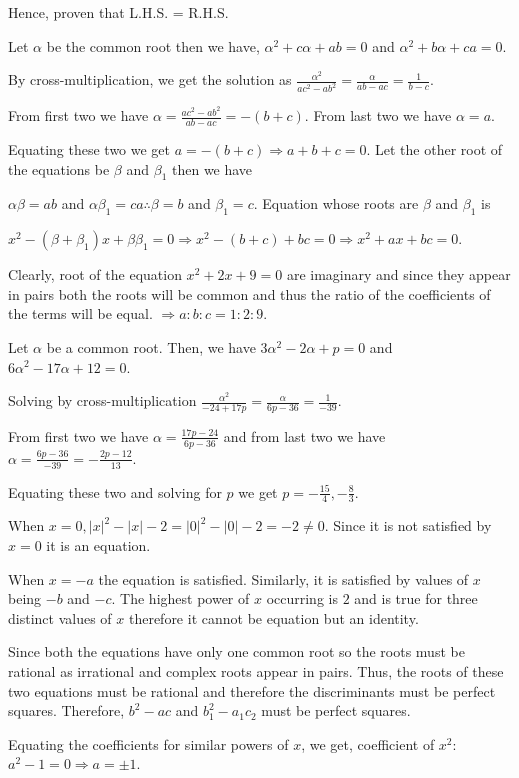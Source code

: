   Hence, proven that L.H.S. = R.H.S.
\item Let $\alpha$ be the common root then we have, $\alpha^2 + c\alpha + ab = 0$ and $\alpha^2 + b\alpha + ca = 0$.

  By cross-multiplication, we get the solution as $\frac{\alpha^2}{ac^2 - ab^2} = \frac{\alpha}{ab - ac} =
  \frac{1}{b - c}$.

  From first two we have $\alpha = \frac{ac^2 - ab^2}{ab - ac} = -(b + c)$. From last two we have $\alpha = a$.

  Equating these two we get $a = -(b + c) \Rightarrow a + b + c = 0$. Let the other root of the equations be
  $\beta$ and $\beta_1$ then we have

  $\alpha\beta = ab$ and $\alpha\beta_1 = ca\therefore \beta = b$ and $\beta_1 = c$. Equation whose roots are
  $\beta$ and $\beta_1$ is

  $x^2 - (\beta + \beta_1)x + \beta\beta_1 = 0 \Rightarrow x^2 -(b + c) + bc = 0 \Rightarrow x^2 + ax + bc =
  0$.
\item Clearly, root of the equation $x^2 + 2x + 9 = 0$ are imaginary and since they appear in pairs both the
  roots will be common and thus the ratio of the coefficients of the terms will be equal. $\Rightarrow a :
  b: c = 1 : 2 : 9$.
\item Let $\alpha$ be a common root. Then, we have $3\alpha^2 -2\alpha + p = 0$ and $6\alpha^2 - 17\alpha + 12 = 0$.

  Solving by cross-multiplication $\frac{\alpha^2}{-24 + 17p} = \frac{\alpha}{6p - 36} = \frac{1}{-39}$.

  From first two we have $\alpha = \frac{17p - 24}{6p - 36}$ and from last two we have $\alpha = \frac{6p -
    36}{-39} = -\frac{2p - 12}{13}$.

  Equating these two and solving for $p$ we get $p = -\frac{15}{4}, -\frac{8}{3}$.
\item When $x = 0, |x|^2 - |x| - 2 = |0|^2 - |0| - 2 = -2 \ne 0$. Since it is not satisfied by
  $x = 0$ it is an equation.
\item When $x = -a$ the equation is satisfied. Similarly, it is satisfied by values of $x$ being $-b$ and
  $-c$. The highest power of $x$ occurring is $2$ and is true for three distinct values of $x$
  therefore it cannot be equation but an identity.
\item Since both the equations have only one common root so the roots must be rational as irrational and
  complex roots appear in pairs. Thus, the roots of these two equations must be rational and therefore the
  discriminants must be perfect squares. Therefore, $b^2 - ac$ and $b_1^2 - a_1c_2$ must be perfect squares.
\item Equating the coefficients for similar powers of $x$, we get, coefficient of $x^2:$ $a^2 - 1 = 0
  \Rightarrow a = \pm1$.

